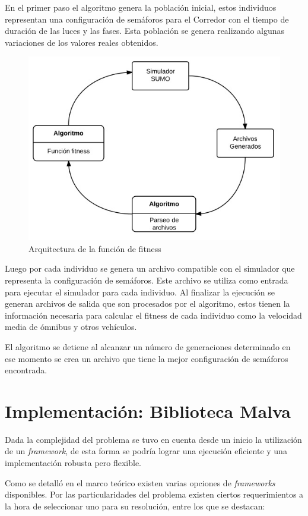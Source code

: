 En el primer paso el algoritmo genera la población inicial, estos individuos representan una configuración de semáforos para el Corredor con el tiempo de duración de las luces y las fases. Esta población se genera realizando algunas variaciones de los valores reales obtenidos.

\begin{figure}[H]
	\centering
	\includegraphics[width=0.7\linewidth]{Figures/arquitectura1}
	\caption{Arquitectura de la función de fitness}
	\label{fig:arquitectura1}
\end{figure}

Luego por cada individuo se genera un archivo compatible con el simulador que representa la configuración de semáforos. Este archivo se utiliza como entrada para ejecutar el simulador para cada individuo. Al finalizar la ejecución se generan archivos de salida que son procesados por el algoritmo, estos tienen la información necesaria para calcular el fitness de cada individuo como la velocidad media de ómnibus y otros vehículos.

El algoritmo se detiene al alcanzar un número de generaciones determinado en ese momento se crea un archivo que tiene la mejor configuración de semáforos encontrada.




\section{Implementación: Biblioteca Malva}

Dada la complejidad del problema se tuvo en cuenta desde un inicio la utilización de un \emph{framework}, de esta forma se podría lograr una ejecución eficiente y una implementación robusta pero flexible. 

Como se detalló en el marco teórico existen varias opciones de \emph{frameworks} disponibles. Por las particularidades del problema existen ciertos requerimientos a la hora de seleccionar  uno para su resolución, entre los que se destacan:


